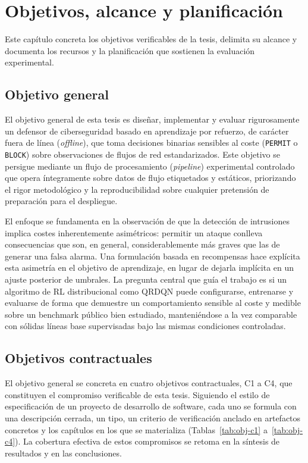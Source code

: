 \chapter{Objetivos, alcance y planificación}

Este capítulo concreta los objetivos verificables de la tesis, delimita su alcance y documenta los recursos y la planificación que sostienen la evaluación experimental.

\section{Objetivo general}
El objetivo general de esta tesis es diseñar, implementar y evaluar rigurosamente un defensor de ciberseguridad basado en aprendizaje por refuerzo, de carácter fuera de línea (\emph{offline}), que toma decisiones binarias sensibles al coste (\texttt{PERMIT} o \texttt{BLOCK}) sobre observaciones de flujos de red estandarizados. Este objetivo se persigue mediante un flujo de procesamiento (\emph{pipeline}) experimental controlado que opera íntegramente sobre datos de flujo etiquetados y estáticos, priorizando el rigor metodológico y la reproducibilidad sobre cualquier pretensión de preparación para el despliegue.

El enfoque se fundamenta en la observación de que la detección de intrusiones implica costes inherentemente asimétricos: permitir un ataque conlleva consecuencias que son, en general, considerablemente más graves que las de generar una falsa alarma. Una formulación basada en recompensas hace explícita esta asimetría en el objetivo de aprendizaje, en lugar de dejarla implícita en un ajuste posterior de umbrales. La pregunta central que guía el trabajo es si un algoritmo de RL distribucional como QRDQN puede configurarse, entrenarse y evaluarse de forma que demuestre un comportamiento sensible al coste y medible sobre un benchmark público bien estudiado, manteniéndose a la vez comparable con sólidas líneas base supervisadas bajo las mismas condiciones controladas.

\section{Objetivos contractuales}
El objetivo general se concreta en cuatro objetivos contractuales, C1 a C4, que constituyen el compromiso verificable de esta tesis. Siguiendo el estilo de especificación de un proyecto de desarrollo de software, cada uno se formula con una descripción cerrada, un tipo, un criterio de verificación anclado en artefactos concretos y los capítulos en los que se materializa (Tablas~\ref{tab:obj-c1} a~\ref{tab:obj-c4}). La cobertura efectiva de estos compromisos se retoma en la síntesis de resultados y en las conclusiones.

